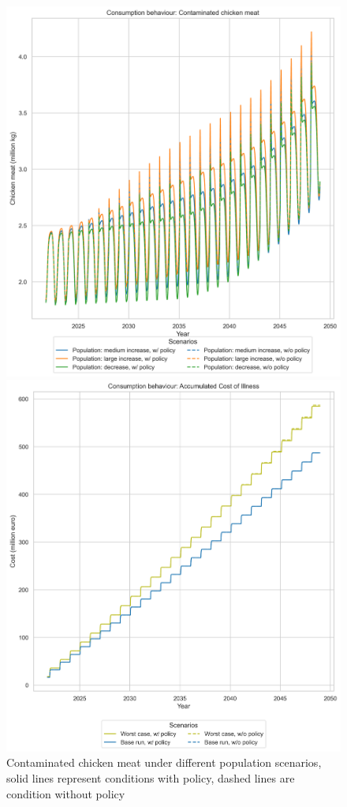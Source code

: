 \begin{figure}[h!]
    \centering
    \begin{minipage}{0.45\textwidth}
        \centering
        \includegraphics[width=1\textwidth]{images/cb_Population_meat.png}
        \caption{Contaminated chicken meat under different population scenarios, solid lines represent conditions with policy, dashed lines are condition without policy}
        \label{fig:pc_pop_meat}
    \end{minipage}\hfill
    \begin{minipage}{0.45\textwidth}
        \centering
        \includegraphics[width=1\textwidth]{images/cb_Base and Worst Case_acoi.png}

\end{minipage}
\end{figure}
